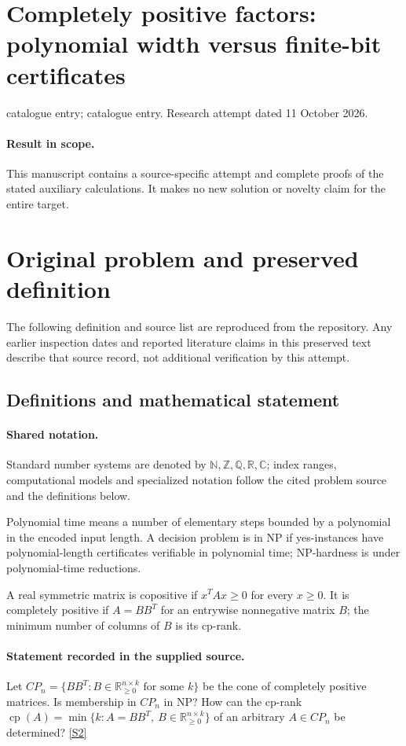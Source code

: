 \documentclass[11pt]{article}
\begin{document}
\section*{Completely positive factors: polynomial width versus finite-bit certificates}
\noindent catalogue entry; catalogue entry. Research attempt dated 11 October 2026.
\paragraph{Result in scope.}This manuscript contains a source-specific attempt and complete proofs of the stated auxiliary calculations. It makes no new solution or novelty claim for the entire target.
\section{Original problem and preserved definition}
The following definition and source list are reproduced from the repository. Any earlier inspection dates and reported literature claims in this preserved text describe that source record, not additional verification by this attempt.
\subsection{Definitions and mathematical statement}

\paragraph{Shared notation.}Standard number systems are denoted by $\mathbb N,\mathbb Z,\mathbb Q,\mathbb R,\mathbb C$; index ranges, computational models and specialized notation follow the cited problem source and the definitions below.


Polynomial time means a number of elementary steps bounded by a polynomial in the encoded input length. A decision problem is in $\mathrm{NP}$ if yes-instances have polynomial-length certificates verifiable in polynomial time; NP-hardness is under polynomial-time reductions.

A real symmetric matrix is copositive if $x^TAx\geq0$ for every $x\geq0$. It is completely positive if $A=BB^T$ for an entrywise nonnegative matrix $B$; the minimum number of columns of $B$ is its cp-rank.
\paragraph{Statement recorded in the supplied source.}
Let $CP_n=\{BB^T:B\in\mathbb R_{\geq0}^{n\times k}\text{ for some }k\}$ be the cone of completely positive matrices. Is membership in $CP_n$ in NP? How can the cp-rank $\operatorname{cp}(A)=\min\{k:A=BB^T,\ B\in\mathbb R_{\geq0}^{n\times k}\}$ of an arbitrary $A\in CP_n$ be determined? \href{https://doi.org/10.4171/owr/2015/46}{[S2]}
\end{document}
